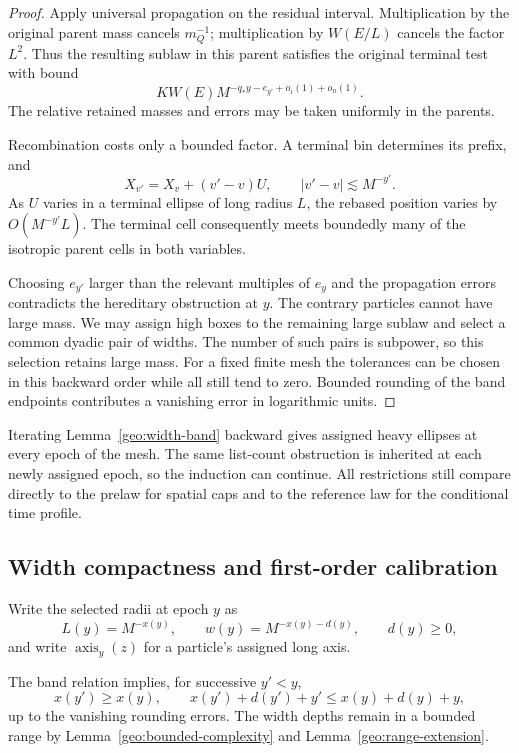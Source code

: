 \begin{proof}
Apply universal propagation on the residual interval.
Multiplication by the original parent mass cancels
\(m_Q^{-1}\); multiplication by \(W(E/L)\) cancels the
factor \(L^2\).  Thus the resulting sublaw in this parent
satisfies the original terminal test with bound
\[
KW(E)M^{-q_*y-e_{y'}+o_i(1)+o_n(1)}.
\]
The relative retained masses and errors may be taken
uniformly in the parents.

Recombination costs only a bounded factor.  A terminal
bin determines its prefix, and
\[
X_{v'}=X_v+(v'-v)U,\qquad |v'-v|\lesssim M^{-y'}.
\]
As \(U\) varies in a terminal ellipse of long radius \(L\),
the rebased position varies by \(O(M^{-y'}L)\).
The terminal cell consequently meets boundedly many of
the isotropic parent cells in both variables.

Choosing \(e_{y'}\) larger than the relevant multiples of
\(e_y\) and the propagation errors contradicts the
hereditary obstruction at \(y\).  The contrary particles
cannot have large mass.  We may assign high boxes to the
remaining large sublaw and select a common dyadic pair
of widths.  The number of such pairs is subpower, so
this selection retains large mass.  For a fixed finite
mesh the tolerances can be chosen in this backward
order while all still tend to zero.  Bounded rounding
of the band endpoints contributes a vanishing error
in logarithmic units.
\end{proof}

Iterating Lemma~\ref{geo:width-band} backward gives assigned
heavy ellipses at every epoch of the mesh.  The same
list-count obstruction is inherited at each newly assigned
epoch, so the induction can continue.  All restrictions
still compare directly to the prelaw for spatial caps
and to the reference law for the conditional time profile.

\subsection{Width compactness and first-order calibration}

Write the selected radii at epoch \(y\) as
\[
L(y)=M^{-x(y)},\qquad
w(y)=M^{-x(y)-d(y)},\qquad d(y)\ge0,
\]
and write \(\operatorname{axis}_y(z)\) for a particle's
assigned long axis.

The band relation implies, for successive \(y'<y\),
\[
x(y')\ge x(y),\qquad
x(y')+d(y')+y'\le x(y)+d(y)+y,
\]
up to the vanishing rounding errors.  The width depths
remain in a bounded range by
Lemma~\ref{geo:bounded-complexity} and
Lemma~\ref{geo:range-extension}.

